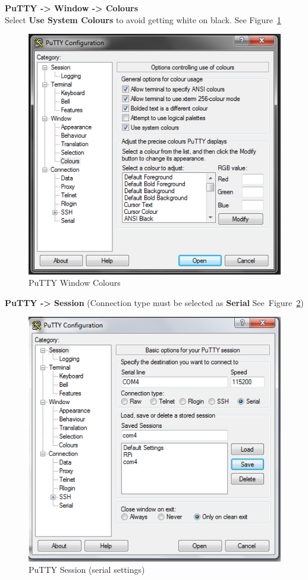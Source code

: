 \documentclass[twocolumn]{article}
\makeatletter
\def\maxwidth{\ifdim\Gin@nat@width>\linewidth\linewidth
\else\Gin@nat@width\fi}
\let\Oldincludegraphics\includegraphics
\renewcommand{\includegraphics}[1]{\Oldincludegraphics[width=\maxwidth]{#1}}
\makeatother
\begin{document}
\textbf{PuTTY -\textgreater{} Window -\textgreater{} Colours}\\Select
\textbf{Use System Colours} to avoid getting white on black. See Figure~\ref{puttycolours}
\begin{figure}[htbp]
\centering
\includegraphics{phys1600/putty_window_colours.png}
\caption{PuTTY Window Colours}
\label{puttycolours}
\end{figure}

\textbf{PuTTY -\textgreater{} Session} (Connection type must be selected
as \textbf{Serial}  See~Figure~\ref{puttysession})
 
\begin{figure}[tbp]
\centering
\includegraphics{phys1600/putty_session.png}
\caption{PuTTY Session (serial settings)}
\label{puttysession}
\end{figure}
\end{document}
